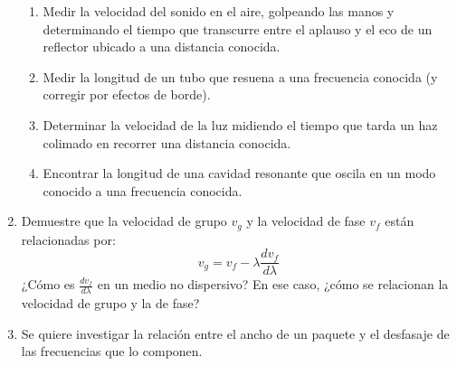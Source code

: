 \documentclass[11pt,spanish,a4paper]{article}
\begin{document}
\begin{enumerate}
\begin{enumerate}
\item Medir la velocidad del sonido en el aire, golpeando las manos y determinando
el tiempo que transcurre entre el aplauso y el eco de un reflector
ubicado a una distancia conocida.
\item Medir la longitud de un tubo que resuena a una frecuencia conocida
(y corregir por efectos de borde).
\item Determinar la velocidad de la luz midiendo el tiempo que tarda un
haz colimado en recorrer una distancia conocida.
\item Encontrar la longitud de una cavidad resonante que oscila en un modo
conocido a una frecuencia conocida.
\end{enumerate}
\item Demuestre que la velocidad de grupo $v_{g}$ y la velocidad de fase
$v_{f}$ están relacionadas por:
\[
v_{g}=v_{f}-\lambda\frac{dv_{f}}{d\lambda}
\]
¿Cómo es $\frac{dv_{f}}{d\lambda}$ en un medio no dispersivo? En
ese caso, ¿cómo se relacionan la velocidad de grupo y la de fase?
\item Se quiere investigar la relación entre el ancho de un paquete y el
desfasaje de las frecuencias que lo componen.



\end{enumerate}
\end{document}
